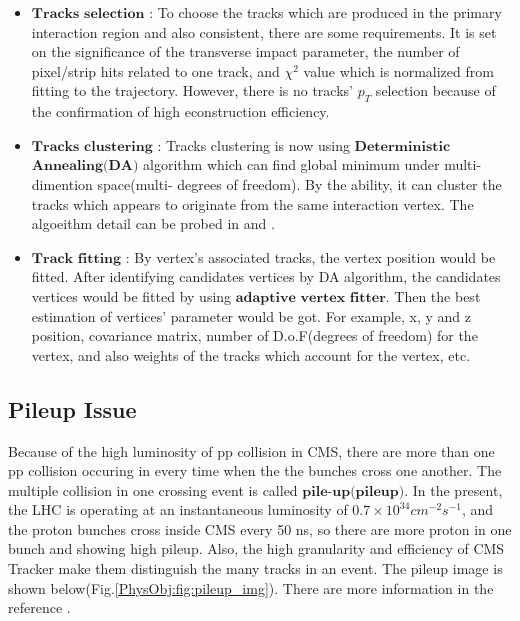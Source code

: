 		\begin{itemize}
			\item $\textbf{Tracks selection}$ : To choose the tracks which are produced in the primary interaction region and also consistent, there are some requirements. It is set on the significance of the transverse impact parameter, the number of pixel/strip hits related to one track, and $\chi^2$ value which is normalized from fitting to the trajectory. However, there is no tracks' $p_T$ selection because of the confirmation of high econstruction efficiency.
			\item $\textbf{Tracks clustering}$ : Tracks clustering is now using $\textbf{Deterministic}$ $\textbf{Annealing(DA)}$\cite{726788} algorithm which can find global minimum under multi-dimention space(multi- degrees of freedom). By the ability, it can cluster the tracks which appears to originate from the same interaction vertex. The algoeithm detail can be probed in \cite{Chatrchyan:2014fea} and \cite{726788}.
			\item $\textbf{Track fitting}$ : By vertex's associated tracks, the vertex position would be fitted. After identifying candidates vertices by DA algorithm, the candidates vertices would be fitted by using $\textbf{adaptive vertex fitter}$\cite{Fruhwirth:2007hz}. Then the best estimation of vertices' parameter would be got. For example, x, y and z position, covariance matrix, number of D.o.F(degrees of freedom) for the vertex, and also weights of the tracks which account for the vertex, etc.
		\label{PhysObj:itm:track_reco}
		\end{itemize}

	\subsection{Pileup Issue}
	\label{ssec:PhysObj_pu}{}

		Because of the high luminosity of pp collision in CMS, there are more than one pp collision occuring in every time when the the bunches cross one another. The multiple collision in one crossing event is called $\textbf{pile-up(pileup)}$. In the present, the LHC is operating at an instantaneous luminosity of $0.7\times10^{34} cm^{-2}s^{-1}$, and the proton bunches cross inside CMS every 50 ns, so there are more proton in one bunch and showing high pileup. Also, the high granularity and efficiency of CMS Tracker make them distinguish the many tracks in an event. The pileup image is shown below(Fig.\ref{PhysObj:fig:pileup_img}). There are more information in the reference \cite{Pileup_page}.

